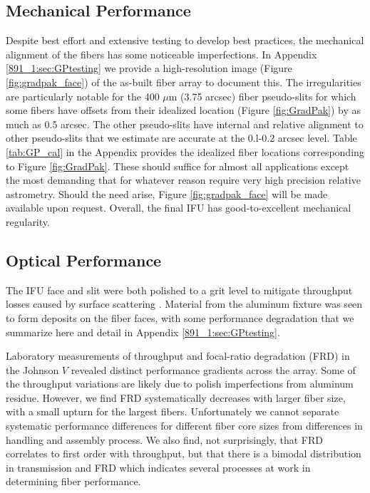 \subsection{Mechanical Performance}

Despite best effort and extensive testing to develop best practices,
the mechanical alignment of the \GP fibers has some noticeable
imperfections. In Appendix \ref{891_1:sec:GPtesting} we provide a
high-resolution image (Figure \ref{fig:gradpak_face}) of the as-built
fiber array to document this. The irregularities are particularly
notable for the 400 $\mu$m (3.75 arcsec) fiber pseudo-slits for which
some fibers have offsets from their idealized location (Figure
\ref{fig:GradPak}) by as much as 0.5 arcsec. The other pseudo-slits
have internal and relative alignment to other pseudo-slits that we
estimate are accurate at the 0.l-0.2 arcsec level. Table
\ref{tab:GP_cal} in the Appendix provides the
idealized fiber locations corresponding to Figure
\ref{fig:GradPak}. These should suffice for almost all applications
except the most demanding that for whatever reason require very high
precision relative astrometry. Should the need arise, Figure
\ref{fig:gradpak_face} will be made available upon request. Overall,
the final IFU has good-to-excellent mechanical regularity.

\subsection{Optical Performance}

\label{891_1:sec:gradpak_performance}

The IFU face and slit were both polished to a  grit
level to mitigate throughput losses caused by surface scattering
\citep{Eigenbrot12}. Material from the aluminum fixture was seen to
form deposits on the fiber faces, with some performance degradation
that we summarize here and detail in Appendix \ref{891_1:sec:GPtesting}.

Laboratory measurements of throughput and focal-ratio degradation
(FRD) in the Johnson $V$ revealed distinct performance gradients
across the array. Some of the throughput variations are likely due to
polish imperfections from aluminum residue. However, we find FRD
systematically decreases with larger fiber size, with a small upturn
for the largest fibers. Unfortunately we cannot separate systematic
performance differences for different fiber core sizes from
differences in handling and assembly process. We also find, not
surprisingly, that FRD correlates to first order with throughput, but
that there is a bimodal distribution in transmission and FRD which
indicates several processes at work in determining fiber performance.

